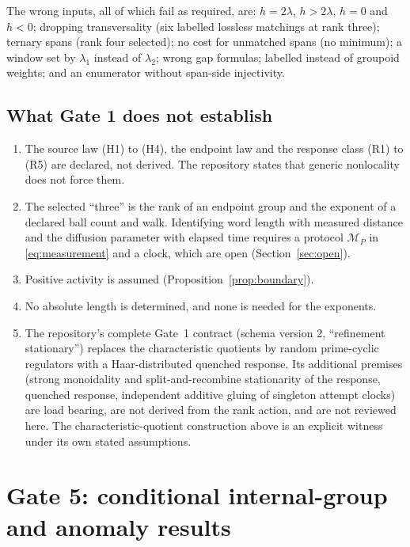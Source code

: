 \documentclass[11pt]{article}
\theoremstyle{definition}
\theoremstyle{remark}
\begin{document}
The wrong inputs, all of which fail as required, are: $h=2\lambda$, $h>2\lambda$, $h=0$
and $h<0$; dropping transversality (six labelled lossless matchings at rank three);
ternary spans (rank four selected); no cost for unmatched spans (no minimum); a window
set by $\lambda_1$ instead of $\lambda_2$; wrong gap formulas; labelled instead of
groupoid weights; and an enumerator without span-side injectivity.

\subsection{What Gate 1 does not establish}
\label{sec:g1scope}

\begin{enumerate}
\item The source law (H1) to (H4), the endpoint law and the response class (R1) to (R5)
  are declared, not derived. The repository states that generic nonlocality does not
  force them.
\item The selected ``three'' is the rank of an endpoint group and the exponent of a
  declared ball count and walk. Identifying word length with measured distance and the
  diffusion parameter with elapsed time requires a protocol $\mathcal M_P$ in
  \eqref{eq:measurement} and a clock, which are open (Section~\ref{sec:open}).
\item Positive activity is assumed (Proposition~\ref{prop:boundary}).
\item No absolute length is determined, and none is needed for the exponents.
\item The repository's complete Gate~1 contract (schema version 2, ``refinement
  stationary'') replaces the characteristic quotients by random prime-cyclic regulators
  with a Haar-distributed quenched response. Its additional premises (strong monoidality
  and split-and-recombine stationarity of the response, quenched response, independent
  additive gluing of singleton attempt clocks) are load bearing, are not derived from the
  rank action, and are not reviewed here. The characteristic-quotient construction above
  is an explicit witness under its own stated assumptions.
\end{enumerate}

\section{Gate 5: conditional internal-group and anomaly results}
\label{sec:gate5}
\end{document}

